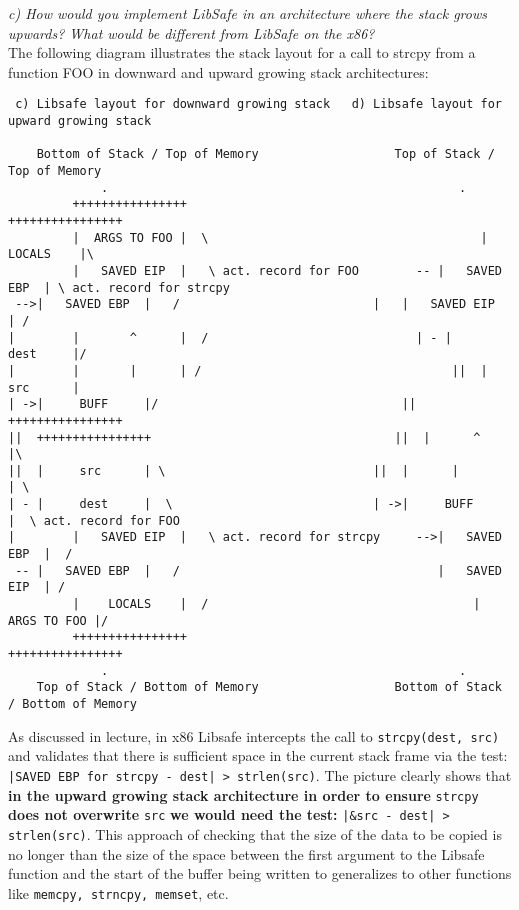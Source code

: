 \noindent \textit{c) How would you implement LibSafe in an architecture where the stack grows upwards? What would be different from LibSafe on the x86?}\\

\noindent The following diagram illustrates the stack layout for a call to strcpy from a function FOO in downward and upward growing stack architectures:
\begin{verbatim}
 c) Libsafe layout for downward growing stack   d) Libsafe layout for upward growing stack 

    Bottom of Stack / Top of Memory                   Top of Stack / Top of Memory
             .                                                 .
  		 ++++++++++++++++ 		                                 ++++++++++++++++ 
  		 |  ARGS TO FOO |  \ 		                              |    LOCALS    |\
  		 |   SAVED EIP  |   \ act. record for FOO        -- |   SAVED EBP  | \ act. record for strcpy
 -->|   SAVED EBP  |   /                           |   |   SAVED EIP  | / 
| 		 |       ^      |  /  	                         | - |     dest     |/ 
| 		 |       |      | /  		                          ||  |     src      |
| ->|     BUFF     |/  		                           ||  ++++++++++++++++
||  ++++++++++++++++ 	      	                      ||  |      ^       |\
||  |     src      | \ 	                           ||  |      |       | \ 
| - |     dest     |  \                            | ->|     BUFF     |  \ act. record for FOO
| 		 |   SAVED EIP  |   \ act. record for strcpy     -->|   SAVED EBP  |  /
 -- |   SAVED EBP  |   /  		                            |   SAVED EIP  | /
  		 |    LOCALS    |  /  		                             |  ARGS TO FOO |/
  		 ++++++++++++++++ 	                            	    ++++++++++++++++
             .                                                 .
    Top of Stack / Bottom of Memory                   Bottom of Stack / Bottom of Memory
\end{verbatim}
As discussed in lecture, in x86 Libsafe intercepts the call to \verb+strcpy(dest, src)+  and validates that there is sufficient space in the current stack frame via the test: \verb+|SAVED EBP for strcpy - dest| > strlen(src)+. The picture clearly shows that \textbf{in the upward growing stack architecture in order to ensure} \verb+strcpy+ \textbf{does not overwrite} \verb+src+\textbf{ we would need the test: }\verb+|&src - dest| > strlen(src)+. This approach of checking that the size of the data to be copied is no longer than the size of the space between the first argument to the Libsafe function and the start of the buffer being written to generalizes to other functions like \verb+memcpy, strncpy, memset+, etc.

